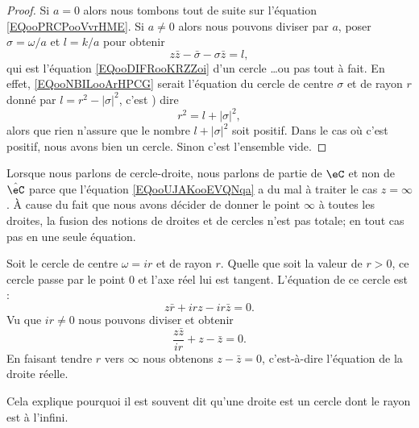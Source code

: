 \begin{proof}
    Si \( a=0\) alors nous tombons tout de suite sur l'équation \eqref{EQooPRCPooVvrHME}. Si \( a\neq 0\) alors nous pouvons diviser par \( a\), poser \( \sigma=\omega/a\) et \( l=k/a\) pour obtenir
    \begin{equation}        \label{EQooNBILooArHPCG}
        z\bar z-\bar\sigma-\sigma\bar z=l,
    \end{equation}
    qui est l'équation \eqref{EQooDIFRooKRZZoi} d'un cercle \ldots ou pas tout à fait. En effet, \eqref{EQooNBILooArHPCG} serait l'équation du cercle de centre \( \sigma\) et de rayon \( r\) donné par $l=r^2-| \sigma |^2$, c'est ) dire
    \begin{equation}
        r^2=l+| \sigma |^2,
    \end{equation}
    alors que rien n'assure que le nombre \( l+| \sigma |^2\) soit positif. Dans le cas où c'est positif, nous avons bien un cercle. Sinon c'est l'ensemble vide.
\end{proof}

\begin{remark}      \label{REMooBMAEooHDvNID}
    Lorsque nous parlons de cercle-droite, nous parlons de partie de \( \eC\) et non de \( \hat \eC\) parce que l'équation \eqref{EQooUJAKooEVQNqa} a du mal à traiter le cas \( z=\infty\). À cause du fait que nous avons décider de donner le point \( \infty\) à toutes les droites, la fusion des notions de droites et de cercles n'est pas totale; en tout cas pas en une seule équation.
\end{remark}

\begin{example}      \label{EXooKFBIooOJKjGL}
    Soit le cercle de centre \( \omega=ir\) et de rayon \( r\). Quelle que soit la valeur de \( r>0\), ce cercle passe par le point \( 0\) et l'axe réel lui est tangent. L'équation de ce cercle est :
    \begin{equation}
        z\bar r+irz-ir\bar z=0.
    \end{equation}
    Vu que \( ir\neq 0\) nous pouvons diviser et obtenir
    \begin{equation}
        \frac{ z\bar z }{ ir }+z-\bar z=0.
    \end{equation}
    En faisant tendre \( r\) vers \( \infty\) nous obtenons \( z-\bar z=0\), c'est-à-dire l'équation de la droite réelle.

    Cela explique pourquoi il est souvent dit qu'une droite est un cercle dont le rayon est à l'infini.
\end{example}

